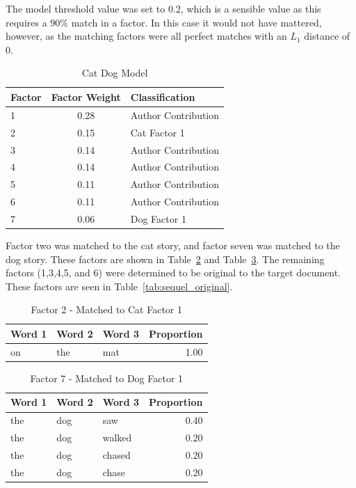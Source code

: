 \documentclass[../ut-dissertation.tex]{subfiles}
\begin{document}
The model threshold value was set to 0.2, which is a sensible value as
this requires a 90\% match in a factor.  In this case it would not
have mattered, however, as the matching factors were all perfect
matches with an $L_1$ distance of 0.

\begin{table}[p]
  \centering
  \caption{Cat Dog Model} \label{tab:cat_dog_class}
  \begin{tabular}{|l|c|l|}
    \hline
    Factor & Factor Weight & Classification\\
    \hline
    1 & 0.28 & Author Contribution\\
    2 & 0.15 & Cat Factor 1\\
    3 & 0.14 & Author Contribution\\
    4 & 0.14 & Author Contribution\\
    5 & 0.11 & Author Contribution\\
    6 & 0.11 & Author Contribution\\
    7 & 0.06 & Dog Factor 1\\
    \hline
  \end{tabular}
\end{table}


Factor two was matched to the cat story, and factor seven was matched
to the dog story.  These factors are shown in
Table~\ref{tab:catfactor} and Table~\ref{tab:dogfactor}.  The
remaining factors (1,3,4,5, and 6) were determined to be original to
the target document.  These factors are seen in
Table~\ref{tab:sequel_original}.

\begin{table}[p]
  \centering
  \caption{Factor 2 - Matched to Cat Factor 1}\label{tab:catfactor}
  \begin{tabular}{|lll|r|}
    \hline
    Word 1 & Word 2 & Word 3 & Proportion\\
    \hline
    on & the & mat & 1.00\\
    \hline
  \end{tabular}
\end{table}

\begin{table}[p]
  \centering
  \caption{Factor 7 - Matched to Dog Factor 1}\label{tab:dogfactor}
  \begin{tabular}{|lll|r|}
    \hline
    Word 1 & Word 2 & Word 3 & Proportion\\
    \hline
    the & dog & saw & 0.40\\
    the & dog & walked & 0.20\\
    the & dog & chased & 0.20\\
    the & dog & chase & 0.20\\
    \hline
  \end{tabular}
\end{table}
\end{document}
